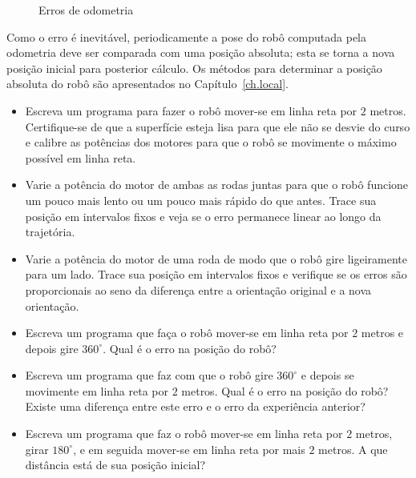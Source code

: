 \begin{figure}
\begin{center}
\end{center}
\caption{Erros de odometria}\label{fig.odo-errors}
\end{figure}

Como o erro é inevitável, periodicamente a pose do robô computada pela odometria deve ser comparada com uma posição absoluta; esta se torna a nova posição inicial para posterior cálculo. Os métodos para determinar a posição absoluta do robô são apresentados no Capítulo~\ref{ch.local}.

\begin{framed}
\begin{itemize}
\item Escreva um programa para fazer o robô mover-se em linha reta por $2$ metros. Certifique-se de que a superfície esteja lisa para que ele não se desvie do curso e calibre as potências dos motores para que o robô se movimente o máximo possível em linha reta.
\item Varie a potência do motor de ambas as rodas juntas para que o robô funcione um pouco mais lento ou um pouco mais rápido do que antes. Trace sua posição em intervalos fixos e veja se o erro permanece linear ao longo da trajetória.
\item Varie a potência do motor de uma roda de modo que o robô gire ligeiramente para um lado. Trace sua posição em intervalos fixos e verifique se os erros são proporcionais ao seno da diferença entre a orientação original e a nova orientação.
\end{itemize}
\end{framed}

\begin{framed}
\begin{itemize}
\item Escreva um programa que faça o robô mover-se em linha reta por $2$ metros e depois gire $360^\circ$. Qual é o erro na posição do robô?
\item Escreva um programa que faz com que o robô gire $360^\circ$ e depois se movimente em linha reta por $2$ metros. Qual é o erro na posição do robô? Existe uma diferença entre este erro e o erro da experiência anterior?
\item Escreva um programa que faz o robô mover-se em linha reta por $2$ metros, girar $180^\circ$, e em seguida mover-se em linha reta por mais $2$ metros. A que distância está de sua posição inicial?
\end{itemize}
\end{framed}

